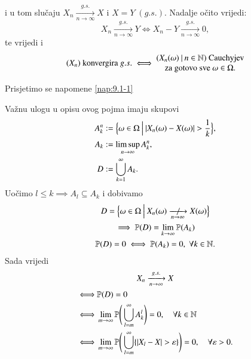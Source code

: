 i u tom slu\v caju $X_n \xrightarrow[n \to \infty]{g.s.} X$ i $X = Y \; (g.s.)$.
Nadalje o\v cito vrijedi:
\begin{equation}    \label{jed:11.3}
    X_n \xrightarrow[n \to \infty]{g.s.} Y \iff X_n - Y \xrightarrow[n \to \infty]{g.s.} 0,
\end{equation}
te vrijedi i
\begin{equation}    \label{jed:11.4}
    (X_n) \textnormal{ konvergira } g.s.
    \iff
    \begin{matrix}
        ({X_n(\omega)} \: | \: {n \in \mathbb{N}}) \textnormal{ Cauchyjev}\\
        \textnormal{za gotovo sve } \omega \in \Omega.
    \end{matrix}
\end{equation}

Prisjetimo se napomene \ref{nap:9.1-1}

Va\v znu ulogu u opisu ovog pojma imaju skupovi
\begin{equation*}
    \begin{aligned}
        A_k^n &:= \Big\{ {\omega \in \Omega} \: \Big| \: {|X_n(\omega) - X(\omega)| > \frac{1}{k}} \Big\},\\
        A_k &:= \limsup\limits_{n \to \infty} A_k^n,\\
        D &:= \bigcup\limits_{k = 1}^{\infty} A_k.
    \end{aligned}
\end{equation*}
Uo\v cimo $l \leq k \implies A_l \subseteq A_k$ i dobivamo
\begin{equation*}
    \begin{gathered}
        D = \bigSkup{\omega \in \Omega}{X_n(\omega) \centernot{\xrightarrow[n \to \infty]{}}X(\omega)}\\
        \implies  \vjeroj{D} = \lim\limits_{k \to \infty} \vjeroj{A_k}\\
        \vjeroj{D} = 0 \iff \vjeroj{A_k} = 0, \; \forall k \in \nat.
    \end{gathered}
\end{equation*}
Sada vrijedi
\begin{equation}    \label{jed:11.5}
    \begin{gathered}
        X_n \xrightarrow[n \to \infty]{g.s.} X\\
        \begin{aligned}
            \iff &\mathbb{P}({D}) = 0\\
            \iff &\lim\limits_{m \to \infty} \mathbb{P} \Bigg( \bigcup\limits_{l = m}^{\infty} A_k^l \Bigg) = 0, \quad \forall k \in \mathbb{N}\\
            \iff &\lim\limits_{m \to \infty} \mathbb{P} \Bigg( \bigcup\limits_{l = m}^{\infty} \{ |X_l - X| > \varepsilon \} \Bigg) = 0, \quad \forall \varepsilon > 0.
        \end{aligned}
    \end{gathered}
\end{equation}

